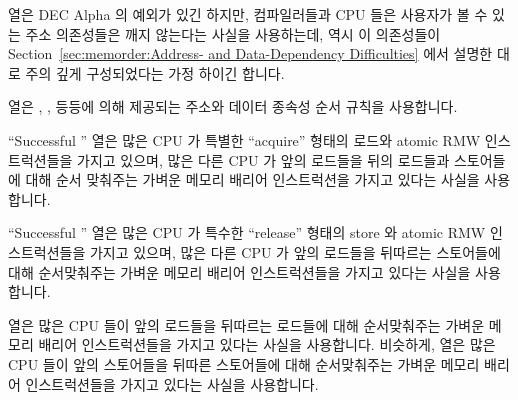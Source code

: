 {	 열은 DEC Alpha 의 예외가 있긴 하지만,
	컴파일러들과 CPU 들은 사용자가 볼 수 있는 주소 의존성들은 깨지 않는다는
	사실을 사용하는데, 역시 이 의존성들이
	Section~\ref{sec:memorder:Address- and Data-Dependency Difficulties}
	에서 설명한 대로 주의 깊게 구성되었다는 가정 하이긴 합니다.

	 열은 ,
	, 등등에 의해 제공되는 주소와 데이터 종속성 순서
	규칙을 사용합니다.

	``Successful '' 열은 많은 CPU 가 특별한 ``acquire''
	형태의 로드와 atomic RMW 인스트럭션들을 가지고 있으며, 많은 다른 CPU 가
	앞의 로드들을 뒤의 로드들과 스토어들에 대해 순서 맞춰주는 가벼운 메모리
	배리어 인스트럭션을 가지고 있다는 사실을 사용합니다.

	``Successful '' 열은 많은 CPU 가 특수한 ``release''
	형태의 store 와 atomic RMW 인스트럭션들을 가지고 있으며, 많은 다른 CPU
	가 앞의 로드들을 뒤따르는 스토어들에 대해 순서맞춰주는 가벼운 메모리
	배리어 인스트럭션들을 가지고 있다는 사실을 사용합니다.

	 열은 많은 CPU 들이 앞의 로드들을 뒤따르는 로드들에 대해
	순서맞춰주는 가벼운 메모리 배리어 인스트럭션들을 가지고 있다는 사실을
	사용합니다.
	비슷하게,
	 열은 많은 CPU 들이 앞의 스토어들을 뒤따른 스토어들에
	대해 순서맞춰주는 가벼운 메모리 배리어 인스트럭션들을 가지고 있다는
	사실을 사용합니다.
	\iffalse

}
